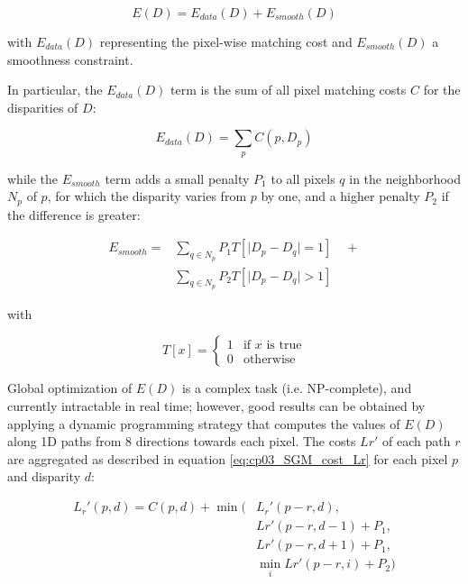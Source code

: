 \begin{equation}\label{eq:cp03_SGM_energy}
E(D) = E_{data}(D) + E_{smooth}(D)
\end{equation}

with $E_{data}(D)$ representing the pixel-wise matching cost and $E_{smooth}(D)$ a smoothness constraint.

In particular, the $E_{data}(D)$ term is the sum of all pixel matching costs $C$ for the disparities of $D$:

\begin{equation}\label{eq:cp03_SGM_energy_data}
E_{data}(D) = \sum_p C(p, D_p)
\end{equation}

while the $E_{smooth}$ term adds a small penalty $P_1$ to all pixels $q$ in the neighborhood $N_p$ of $p$, for which the disparity varies from $p$ by one, and a higher penalty $P_2$ if the difference is greater:

\begin{align}\label{eq:cp03_SGM_energy_smooth}
  E_{smooth} = & \sum_{q \in N_p} P_1 T[\lvert D_p - D_q \rvert = 1] \quad + \nonumber \\
	       & \sum_{q \in N_p} P_2 T[\lvert D_p - D_q \rvert > 1]
\end{align}

with

\begin{equation}\label{eq:cp03_SGM_energy_smooth_T}
 T[x] = \left\{ \begin{array}{ll}
         1 & \mbox{if $x$ is true}\\
         0 & \mbox{otherwise}
         \end{array} \right.
\end{equation}

Global optimization of $E(D)$ is a complex task (i.e. NP-complete), and currently intractable in real time; however, good results can be obtained by applying a dynamic programming strategy that computes the values of $E(D)$ along 1D paths from 8 directions towards each pixel. The costs $Lr'$ of each path $r$ are aggregated as described in equation \ref{eq:cp03_SGM_cost_Lr} for each pixel $p$ and disparity $d$:

\begin{align}\label{eq:cp03_SGM_cost_Lr}
L_r'(p,d) = C(p,d) + \min( & L_r'(p-r,d), \nonumber \\
	    & Lr'(p-r, d-1) + P_1, \nonumber \\
	    & Lr'(p-r,d+1)+P_1, \nonumber \\
	    & \min_i Lr'(p-r, i) + P_2)
\end{align}

